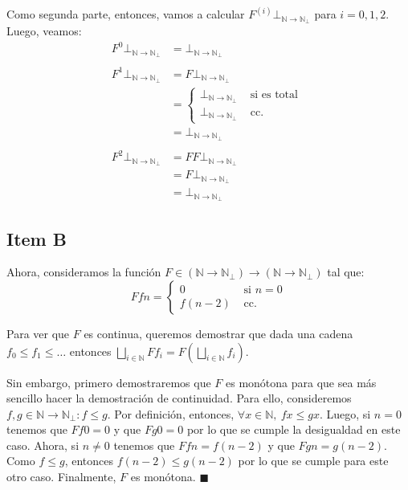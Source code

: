 \documentclass{article}
\newcommand{\N}{\mathbb{N}}
\newcommand{\supr}{\bigsqcup\limits}
\begin{document}
Como segunda parte, entonces, vamos a calcular $F^{(i)} \bot_{\N \to \N_\bot}$ para $i = 0, 1, 2$.
Luego, veamos:
\begin{equation*}
	\begin{aligned}
		F^0 \bot_{\N \to \N_\bot} & = \bot_{\N \to \N_\bot}                        \\
		\\
		F^1 \bot_{\N \to \N_\bot} & = F \bot_{\N \to \N_\bot}                      \\
		                          & = \begin{cases}
			                              \bot_{\N \to \N_\bot} & \text{ si es total } \\
			                              \bot_{\N \to \N_\bot} & \text{ cc. }
		                              \end{cases} \\
		                          & = \bot_{\N \to \N_\bot}                        \\
		\\
		F^2 \bot_{\N \to \N_\bot} & = F F \bot_{\N \to \N_\bot}                    \\
		                          & = F \bot_{\N \to \N_\bot}                      \\
		                          & = \bot_{\N \to \N_\bot}
	\end{aligned}
\end{equation*}

\subsection*{Item B}
Ahora, consideramos la función $F \in (\N \to \N_\bot) \to (\N \to \N_\bot)$ tal que:
\begin{equation*}
	F f n = \begin{cases}
		0        & \text{ si } n = 0 \\
		f(n - 2) & \text{ cc. }
	\end{cases}
\end{equation*}

Para ver que $F$ es continua, queremos demostrar que dada una cadena $f_0 \leq f_1 \leq \dots$ entonces $\supr_{i \in \N} F f_i = F\left(\supr_{i \in \N} f_i\right)$.

Sin embargo, primero demostraremos que $F$ es monótona para que sea más sencillo hacer la demostración de continuidad.
Para ello, consideremos $f, g \in \N \to \N_\bot : f \leq g$.
Por definición, entonces, $\forall x \in \N,\ f x \leq g x$.
Luego, si $n = 0$ tenemos que $F f 0 = 0$ y que $F g 0 = 0$ por lo que se cumple la desigualdad en este caso.
Ahora, si $n \neq 0$ tenemos que $F f n = f(n-2)$ y que $F g n = g(n-2)$.
Como $f \leq g$, entonces $f(n-2) \leq g(n-2)$ por lo que se cumple para este otro caso.
Finalmente, $F$ es monótona. $\blacksquare$
\end{document}
